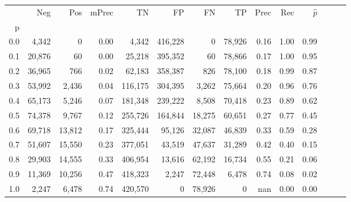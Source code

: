 \begin{tabular}{rrrrrrrrrrrrrr}
\toprule
{} &     Neg &     Pos & mPrec &       TN &       FP &      FN &      TP &  Prec &   Rec & $\hat{p}$ \\
p   &         &         &       &          &          &         &         &       &       &           \\
\midrule
0.0 &   4,342 &       0 &  0.00 &    4,342 &  416,228 &       0 &  78,926 &  0.16 &  1.00 &      0.99 \\
0.1 &  20,876 &      60 &  0.00 &   25,218 &  395,352 &      60 &  78,866 &  0.17 &  1.00 &      0.95 \\
0.2 &  36,965 &     766 &  0.02 &   62,183 &  358,387 &     826 &  78,100 &  0.18 &  0.99 &      0.87 \\
0.3 &  53,992 &   2,436 &  0.04 &  116,175 &  304,395 &   3,262 &  75,664 &  0.20 &  0.96 &      0.76 \\
0.4 &  65,173 &   5,246 &  0.07 &  181,348 &  239,222 &   8,508 &  70,418 &  0.23 &  0.89 &      0.62 \\
0.5 &  74,378 &   9,767 &  0.12 &  255,726 &  164,844 &  18,275 &  60,651 &  0.27 &  0.77 &      0.45 \\
0.6 &  69,718 &  13,812 &  0.17 &  325,444 &   95,126 &  32,087 &  46,839 &  0.33 &  0.59 &      0.28 \\
0.7 &  51,607 &  15,550 &  0.23 &  377,051 &   43,519 &  47,637 &  31,289 &  0.42 &  0.40 &      0.15 \\
0.8 &  29,903 &  14,555 &  0.33 &  406,954 &   13,616 &  62,192 &  16,734 &  0.55 &  0.21 &      0.06 \\
0.9 &  11,369 &  10,256 &  0.47 &  418,323 &    2,247 &  72,448 &   6,478 &  0.74 &  0.08 &      0.02 \\
1.0 &   2,247 &   6,478 &  0.74 &  420,570 &        0 &  78,926 &       0 &   nan &  0.00 &      0.00 \\
\bottomrule
\end{tabular}
